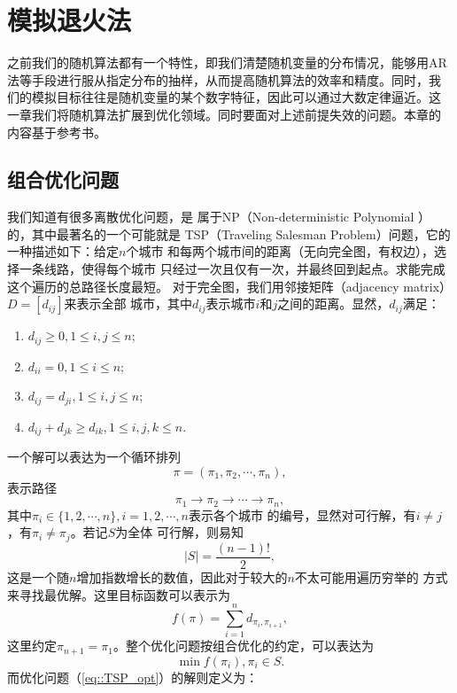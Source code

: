 \chapter{模拟退火法}

之前我们的随机算法都有一个特性，即我们清楚随机变量的分布情况，能够用AR
法等手段进行服从指定分布的抽样，从而提高随机算法的效率和精度。同时，我
们的模拟目标往往是随机变量的某个数字特征，因此可以通过大数定律逼近。这
一章我们将随机算法扩展到优化领域。同时要面对上述前提失效的问题。本章的
内容基于参考书\cite{Kanglishan1994}。

\section{组合优化问题}
我们知道有很多离散优化问题，是
属于NP（Non-deterministic Polynomial ）的，其中最著名的一个可能就是
TSP（Traveling Salesman Problem）问题，它的一种描述如下：给定$n$个城市
和每两个城市间的距离（无向完全图，有权边），选择一条线路，使得每个城市
只经过一次且仅有一次，并最终回到起点。求能完成这个遍历的总路径长度最短。
对于完全图，我们用邻接矩阵（adjacency matrix）$D = [d_{ij}]$来表示全部
城市，其中$d_{ij}$表示城市$i$和$j$之间的距离。显然，$d_{ij}$满足：
\begin{enumerate}
\item $d_{ij} \geq 0, 1 \leq i, j \leq n$;
\item $d_{ii} = 0, 1 \leq i \leq n$;
\item $d_{ij} = d_{ji}, 1 \leq i, j \leq n$;
\item $d_{ij} + d_{jk} \geq d_{ik}, 1 \leq i, j, k \leq n$.
\end{enumerate}
一个解可以表达为一个循环排列
$$
\pi = (\pi_1, \pi_2, \cdots, \pi_n),
$$
表示路径
$$
\pi_1 \to \pi_2 \to \cdots \to \pi_n,
$$
其中$\pi_i \in \{1, 2, \cdots, n\}, i = 1, 2, \cdots, n$表示各个城市
的编号，显然对可行解，有$i \neq j$，有$\pi_i \neq \pi_j$。若记$S$为全体
可行解，则易知
\begin{equation}
  |S| = \frac{(n - 1)!}{2},
\end{equation}
这是一个随$n$增加指数增长的数值，因此对于较大的$n$不太可能用遍历穷举的
方式来寻找最优解。这里目标函数可以表示为
\begin{equation}
  f(\pi) = \sum_{i = 1}^n d_{\pi_i, \pi_{i + 1}},
\end{equation}
这里约定$\pi_{n + 1} = \pi_1$。整个优化问题按组合优化的约定，可以表达为
\begin{equation}
  \min f(\pi_i), \pi_i \in S.
\label{eq::TSP_opt}
\end{equation}
而优化问题（\ref{eq::TSP_opt}）的解则定义为：

